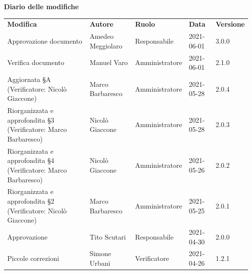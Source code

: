 \documentclass[a4paper]{article}
\begin{document}
\begin{center}
    \centering
    \textbf{\Large Diario delle modifiche}\\
    \vspace{10px}
    \renewcommand{\arraystretch}{1.8}
    \label{tab:Diario delle modifiche}
    \begin{longtable}[!h]{p{160px} p{80px} p{70px} p{55px} p{40px}}
        \rowcolor{logo!70} \textbf{Modifica}                                       & \textbf{Autore}                             & \textbf{Ruolo} & \textbf{Data} & \textbf{Versione} \\
        Approvazione documento                                                     & Amedeo Meggiolaro                           & Responsabile   & 2021-06-01    & 3.0.0             \\
        Verifica documento                                                         & Manuel Varo                                 & Amministratore & 2021-06-01    & 2.1.0             \\
        Aggiornata \S A \newline (Verificatore: Nicolò Giaccone)                   & Marco Barbaresco                            & Amministratore & 2021-05-28    & 2.0.4             \\
        Riorganizzata e approfondita \S3 \newline (Verificatore: Marco Barbaresco) & Nicolò Giaccone                             & Amministratore & 2021-05-28    & 2.0.3             \\
        Riorganizzata e approfondita \S4 \newline (Verificatore: Marco Barbaresco) & Nicolò Giaccone                             & Amministratore & 2021-05-26    & 2.0.2             \\
        Riorganizzata e approfondita \S2 \newline (Verificatore: Nicolò Giaccone)  & Marco Barbaresco                            & Amministratore & 2021-05-25    & 2.0.1             \\
        Approvazione                                                               & Tito Scutari                                & Responsabile   & 2021-04-30    & 2.0.0             \\
        Piccole correzioni                                                         & Simone Urbani                               & Verificatore   & 2021-04-26    & 1.2.1             \\

\end{longtable}
\end{center}
\end{document}
